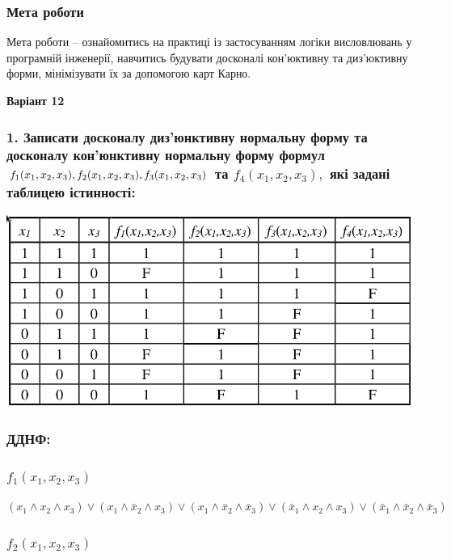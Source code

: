 \documentclass[14pt,]{extreport}
\begin{document}
\pagestyle{empty}



\subsubsection*{Мета роботи}

Мета роботи – ознайомитись на практиці із застосуванням логіки
висловлювань у програмній інженерії, навчитись будувати досконалі кон’юктивну
та диз’юктивну форми, мінімізувати їх за допомогою карт Карно.

\begin{center}\bf Варіант 12\end{center}

\subsubsection*{1. Записати досконалу диз’юнктивну нормальну
форму та досконалу кон’юнктивну нормальну форму формул
$f_1(x_1,x_2,x_3), f_2(x_1,x_2,x_3),\\ f_3(x_1,x_2,x_3)$ та $f_4(x_1,x_2,x_3),$
які задані таблицею істинності:}

\begin{center}
\includegraphics[width=.7\textwidth]{table.png}
\end{center}


\subsubsection*{ДДНФ:}
\subsubsection{$f_1(x_1,x_2,x_3)$}


$
(	x_1\land x_2\land x_3)\lor
(	x_1\land \bar x_2\land x_3)\lor
(	x_1\land \bar x_2\land \bar x_3)\lor
(	\bar x_1\land x_2\land x_3)\lor
(	\bar x_1\land \bar x_2\land \bar x_3)
$

\subsubsection{$f_2(x_1,x_2,x_3)$}
\end{document}
